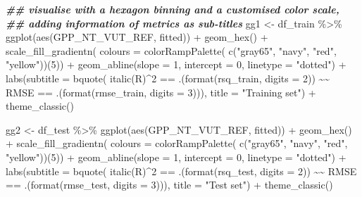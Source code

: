 \documentclass[
]{book}
\newenvironment{Shaded}{\begin{snugshade}}{\end{snugshade}}
\newcommand{\AttributeTok}[1]{\textcolor[rgb]{0.77,0.63,0.00}{#1}}
\newcommand{\DecValTok}[1]{\textcolor[rgb]{0.00,0.00,0.81}{#1}}
\newcommand{\DocumentationTok}[1]{\textcolor[rgb]{0.56,0.35,0.01}{\textbf{\textit{#1}}}}
\newcommand{\ErrorTok}[1]{\textcolor[rgb]{0.64,0.00,0.00}{\textbf{#1}}}
\newcommand{\FunctionTok}[1]{\textcolor[rgb]{0.00,0.00,0.00}{#1}}
\newcommand{\NormalTok}[1]{#1}
\newcommand{\OtherTok}[1]{\textcolor[rgb]{0.56,0.35,0.01}{#1}}
\newcommand{\SpecialCharTok}[1]{\textcolor[rgb]{0.00,0.00,0.00}{#1}}
\newcommand{\StringTok}[1]{\textcolor[rgb]{0.31,0.60,0.02}{#1}}
\begin{document}
\begin{Shaded}
\begin{Highlighting}[]
  \DocumentationTok{\#\# visualise with a hexagon binning and a customised color scale,}
  \DocumentationTok{\#\# adding information of metrics as sub{-}titles}
\NormalTok{  gg1 }\OtherTok{\textless{}{-}}\NormalTok{ df\_train }\SpecialCharTok{\%\textgreater{}\%} 
    \FunctionTok{ggplot}\NormalTok{(}\FunctionTok{aes}\NormalTok{(GPP\_NT\_VUT\_REF, fitted)) }\SpecialCharTok{+}
    \FunctionTok{geom\_hex}\NormalTok{() }\SpecialCharTok{+}
    \FunctionTok{scale\_fill\_gradientn}\NormalTok{(}
      \AttributeTok{colours =} \FunctionTok{colorRampPalette}\NormalTok{( }\FunctionTok{c}\NormalTok{(}\StringTok{"gray65"}\NormalTok{, }\StringTok{"navy"}\NormalTok{, }\StringTok{"red"}\NormalTok{, }\StringTok{"yellow"}\NormalTok{))(}\DecValTok{5}\NormalTok{)) }\SpecialCharTok{+}
    \FunctionTok{geom\_abline}\NormalTok{(}\AttributeTok{slope =} \DecValTok{1}\NormalTok{, }\AttributeTok{intercept =} \DecValTok{0}\NormalTok{, }\AttributeTok{linetype =} \StringTok{"dotted"}\NormalTok{) }\SpecialCharTok{+}
    \FunctionTok{labs}\NormalTok{(}\AttributeTok{subtitle =} \FunctionTok{bquote}\NormalTok{( }\FunctionTok{italic}\NormalTok{(R)}\SpecialCharTok{\^{}}\DecValTok{2} \SpecialCharTok{==}\NormalTok{ .(}\FunctionTok{format}\NormalTok{(rsq\_train, }\AttributeTok{digits =} \DecValTok{2}\NormalTok{)) }\SpecialCharTok{\textasciitilde{}}\ErrorTok{\textasciitilde{}}
\NormalTok{                            RMSE }\SpecialCharTok{==}\NormalTok{ .(}\FunctionTok{format}\NormalTok{(rmse\_train, }\AttributeTok{digits =} \DecValTok{3}\NormalTok{))),}
         \AttributeTok{title =} \StringTok{"Training set"}\NormalTok{) }\SpecialCharTok{+}
    \FunctionTok{theme\_classic}\NormalTok{()}
  
\NormalTok{  gg2 }\OtherTok{\textless{}{-}}\NormalTok{ df\_test }\SpecialCharTok{\%\textgreater{}\%} 
    \FunctionTok{ggplot}\NormalTok{(}\FunctionTok{aes}\NormalTok{(GPP\_NT\_VUT\_REF, fitted)) }\SpecialCharTok{+}
    \FunctionTok{geom\_hex}\NormalTok{() }\SpecialCharTok{+}
    \FunctionTok{scale\_fill\_gradientn}\NormalTok{(}
      \AttributeTok{colours =} \FunctionTok{colorRampPalette}\NormalTok{( }\FunctionTok{c}\NormalTok{(}\StringTok{"gray65"}\NormalTok{, }\StringTok{"navy"}\NormalTok{, }\StringTok{"red"}\NormalTok{, }\StringTok{"yellow"}\NormalTok{))(}\DecValTok{5}\NormalTok{)) }\SpecialCharTok{+}
    \FunctionTok{geom\_abline}\NormalTok{(}\AttributeTok{slope =} \DecValTok{1}\NormalTok{, }\AttributeTok{intercept =} \DecValTok{0}\NormalTok{, }\AttributeTok{linetype =} \StringTok{"dotted"}\NormalTok{) }\SpecialCharTok{+}
    \FunctionTok{labs}\NormalTok{(}\AttributeTok{subtitle =} \FunctionTok{bquote}\NormalTok{( }\FunctionTok{italic}\NormalTok{(R)}\SpecialCharTok{\^{}}\DecValTok{2} \SpecialCharTok{==}\NormalTok{ .(}\FunctionTok{format}\NormalTok{(rsq\_test, }\AttributeTok{digits =} \DecValTok{2}\NormalTok{)) }\SpecialCharTok{\textasciitilde{}}\ErrorTok{\textasciitilde{}}
\NormalTok{                            RMSE }\SpecialCharTok{==}\NormalTok{ .(}\FunctionTok{format}\NormalTok{(rmse\_test, }\AttributeTok{digits =} \DecValTok{3}\NormalTok{))),}
         \AttributeTok{title =} \StringTok{"Test set"}\NormalTok{) }\SpecialCharTok{+}
    \FunctionTok{theme\_classic}\NormalTok{()}
  

\end{Highlighting}
\end{Shaded}
\end{document}
